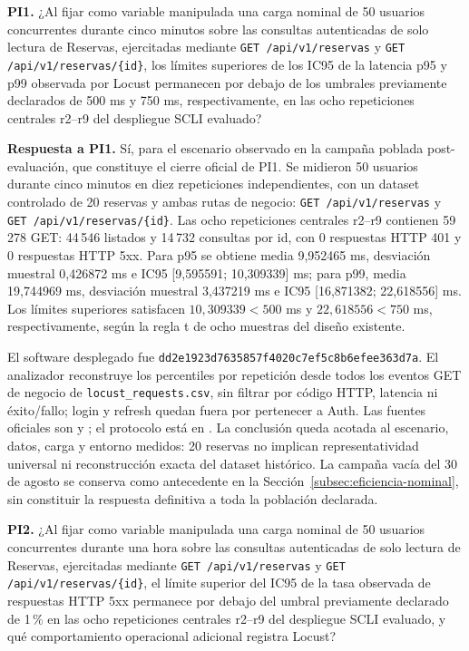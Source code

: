\textbf{PI1.} ¿Al fijar como variable manipulada una carga nominal de 50
usuarios concurrentes durante cinco minutos sobre las consultas autenticadas
de solo lectura de Reservas, ejercitadas mediante
\texttt{GET /api/v1/reservas} y \texttt{GET /api/v1/reservas/\{id\}}, los límites superiores de los IC95 de
la latencia p95 y p99 observada por Locust permanecen por debajo de los
umbrales previamente declarados de 500 ms y 750 ms, respectivamente, en las
ocho repeticiones centrales r2--r9 del despliegue SCLI evaluado?

\textbf{Respuesta a PI1.} Sí, para el escenario observado en la campaña
poblada post-evaluación, que constituye el cierre oficial de PI1. Se midieron
50 usuarios durante cinco minutos en diez repeticiones independientes, con un
dataset controlado de 20 reservas y ambas rutas de negocio:
\texttt{GET /api/v1/reservas} y \texttt{GET /api/v1/reservas/\{id\}}.
Las ocho repeticiones centrales r2--r9 contienen 59\,278 GET:
44\,546 listados y 14\,732 consultas por id, con 0 respuestas HTTP 401 y
0 respuestas HTTP 5xx. Para p95 se obtiene media 9,952465 ms, desviación
muestral 0,426872 ms e IC95 [9,595591; 10,309339] ms; para p99, media
19,744969 ms, desviación muestral 3,437219 ms e IC95
[16,871382; 22,618556] ms. Los límites superiores satisfacen
$10,309339 < 500$ ms y $22,618556 < 750$ ms, respectivamente, según la
regla t de ocho muestras del diseño existente.

El software desplegado fue
\texttt{dd2e1923d7635857f4020c7ef5c8b6efee363d7a}. El analizador reconstruye
los percentiles por repetición desde todos los eventos GET de negocio de
\texttt{locust\_requests.csv}, sin filtrar por código HTTP, latencia ni
éxito/fallo; login y refresh quedan fuera por pertenecer a Auth.
Las fuentes oficiales son
 y
;
el protocolo está en
.
La conclusión queda acotada al escenario, datos, carga y entorno medidos:
20 reservas no implican representatividad universal ni reconstrucción exacta
del dataset histórico. La campaña vacía del 30 de agosto se conserva como
antecedente en la Sección~\ref{subsec:eficiencia-nominal}, sin constituir la
respuesta definitiva a toda la población declarada.

\textbf{PI2.} ¿Al fijar como variable manipulada una carga nominal de 50
usuarios concurrentes durante una hora sobre las consultas autenticadas de
solo lectura de Reservas, ejercitadas mediante
\texttt{GET /api/v1/reservas} y \texttt{GET /api/v1/reservas/\{id\}}, el límite superior del IC95 de la tasa
observada de respuestas HTTP 5xx permanece por debajo del umbral previamente
declarado de 1\,\% en las ocho repeticiones centrales r2--r9 del despliegue
SCLI evaluado, y qué comportamiento operacional adicional registra Locust?

